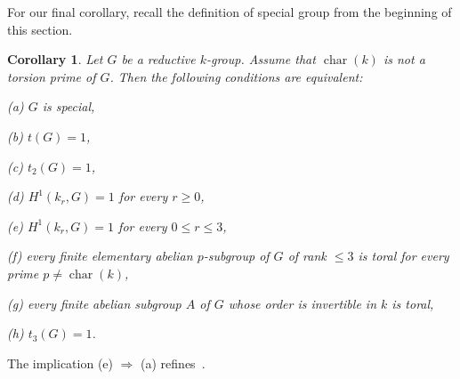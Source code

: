 \documentclass[12pt]{amsart}
\numberwithin{equation}{section}
\newtheorem{corollary}[theorem]{Corollary}
\theoremstyle{remark}
\newcommand{\Char}{\operatorname{char}}
\begin{document}
For our final corollary, recall the definition of special group from the beginning of this section.

\begin{corollary} \label{cor.special} Let $G$ be a reductive $k$-group. Assume that $\Char(k)$ is not a torsion prime of $G$. 
Then the following conditions are equivalent:

\smallskip
(a) $G$ is special,

\smallskip
(b) $t(G) = 1$,

\smallskip
(c) $t_2(G) = 1$,

\smallskip
(d) $H^1(k_r, G) = 1$ for every $r \geqslant 0$,

\smallskip
(e) $H^1(k_r, G) = 1$ for every $0\leqslant r \leqslant 3$,

\smallskip
(f) every finite elementary abelian $p$-subgroup of $G$ of rank $\leqslant 3$ is toral for every prime $p \neq \Char(k)$,

\smallskip
(g) every finite abelian subgroup $A$ of $G$ whose order is invertible in $k$ is toral,

\smallskip
(h) $t_3(G) = 1$.
\end{corollary} 

The implication (e) $\Longrightarrow$ (a) refines~\cite[Theorem 1(c)]{reichstein-youssin-special}.
\end{document}
